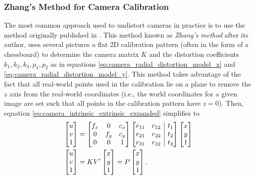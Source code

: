 \documentclass[11pt, letterpaper]{extarticle} %
\begin{document}
\subsubsection{Zhang's Method for Camera Calibration} \label{subsubsec:zhang's_method_for_camera_calibration}
The most common approach used to undistort cameras in practice is to use the method originally published in \cite{zhang2000flexible}. This method known as \textit{Zhang's method} after its author, uses several pictures a flat 2D calibration pattern (often in the form of a chessboard) to determine the camera matrix $K$ and the distortion coefficients $k_1, k_2, k_3, p_1, p_2$ as in equations \ref{eq:camera_radial_distortion_model_x} and \ref{eq:camera_radial_distortion_model_y}. This method takes advantage of the fact that all real-world points used in the calibration lie on a plane to remove the $z$ axis from the real-world coordinates (i.e., the world coordinates for a given image are set such that all points in the calibration pattern have $z = 0$). Then, equation \ref{eq:camera_intrinsic_extrinsic_expanded} simplifies to 
\begin{align}
    \begin{bmatrix} 
        u \\ v \\ 1 
    \end{bmatrix}     
    &= 
    \begin{bmatrix}
        f_x & 0 & c_x \\
        0 & f_y & c_y \\
        0 & 0 & 1
    \end{bmatrix}
    \left[ 
    \begin{array}{@{}cc|c@{}}
        r_{11} & r_{12} & t_1 \\
        r_{21} & r_{22} & t_2 \\
        r_{31} & r_{32} & t_3
    \end{array}
    \right]
    \begin{bmatrix} 
        x \\ y \\ 1
    \end{bmatrix}\\
    \begin{bmatrix} 
        u \\ v \\ 1 
    \end{bmatrix}     
    &=
    KV'
    \begin{bmatrix} 
        x \\ y \\ 1
    \end{bmatrix} 
    =
    P
    \begin{bmatrix} 
        x \\ y \\ 1
    \end{bmatrix}.
\end{align}
\end{document}
